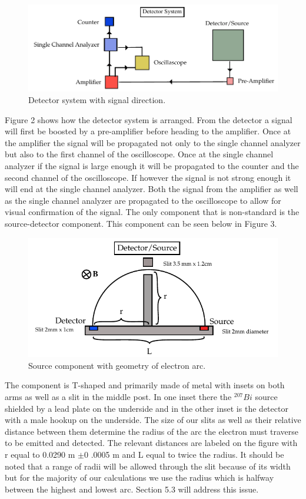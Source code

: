 \begin{figure}[H]
\begin{center}
\includegraphics[width=4 in]{REM-figures.pdf}
\caption{Detector system with signal direction.}
\end{center}
\end{figure}

Figure 2 shows how the detector system is arranged.  From the detector a signal will first be boosted by a pre-amplifier before heading to the amplifier. Once at the amplifier the signal will be propagated not only to the single channel analyzer but also to the first channel of the  oscilloscope.  Once at the single channel analyzer if the signal is large enough it will be propagated to the counter and the second channel of the oscilloscope. If however the signal is not strong enough it will end at the single channel analyzer. Both the signal from the amplifier as well as the single channel analyzer are propagated to the oscilloscope to allow for visual confirmation of the signal.  
The only component that is non-standard is the source-detector component.  This component can be seen below in Figure 3.
 
\begin{figure}[H]
\begin{center}
\includegraphics[width=4 in]{REM-figures2.pdf}
\caption{Source component with geometry of electron arc.}
\end{center}
\end{figure}

The component is T-shaped and primarily made of metal with insets on both arms as well as a slit in the middle post.  In one inset there the $^{207}Bi$ source shielded by a lead plate on the underside and in the other inset is the detector with a male hookup on the underside.  The size of our slits as well as their relative distance between them  determine the radius of the arc the electron must traverse to be emitted and detected. The relevant distances are labeled on the figure with r equal to 0.0290 m $\pm$0 .0005 m and L equal to twice the radius.  It should be noted that a range of radii will be allowed through the slit because of its width but for the majority of our calculations we use the radius which is halfway between the highest and lowest arc. Section 5.3 will address this issue. 

